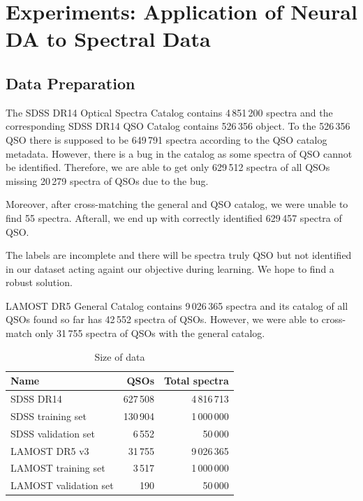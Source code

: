 \chapter{Experiments: Application of Neural DA to Spectral Data}
\label{exp_chapter}

\section{Data Preparation}

The SDSS DR14 Optical Spectra Catalog contains 4\,851\,200 spectra
and the corresponding SDSS DR14 QSO Catalog contains 526\,356 object.
To the 526\,356 QSO there is supposed to be 649\,791 spectra
according to the QSO catalog metadata.
However, there is a bug in the catalog as some spectra of QSO cannot be identified.
Therefore, we are able to get only 629\,512 spectra of all QSOs
missing 20\,279 spectra of QSOs due to the bug.

Moreover, after cross-matching the general and QSO catalog,
we were unable to find 55 spectra.
Afterall, we end up with correctly identified 629\,457 spectra of QSO.

The labels are incomplete and there will be spectra truly QSO
but not identified in our dataset
acting againt our objective during learning.
We hope to find a robust solution.

LAMOST DR5 General Catalog contains 9\,026\,365 spectra
and its catalog of all QSOs found so far has 42\,552 spectra of QSOs.
However, we were able to cross-match only 31\,755 spectra of QSOs with the general catalog.

\begin{table}
	\begin{center}
		\begin{tabular}{|l|r|r|}
			\hline
			Name & QSOs & Total spectra \\ \hline \hline
			SDSS DR14 & 627\,508 & 4\,816\,713 \\ \hline
			SDSS training set & 130\,904 & 1\,000\,000 \\ \hline
			SDSS validation set & 6\,552 & 50\,000 \\ \hline
			LAMOST DR5 v3 & 31\,755 & 9\,026\,365 \\ \hline
			LAMOST training set & 3\,517 & 1\,000\,000 \\ \hline
			LAMOST validation set & 190 & 50\,000 \\ \hline
		\end{tabular}
	\end{center}
	\caption{Size of data}
\end{table}

